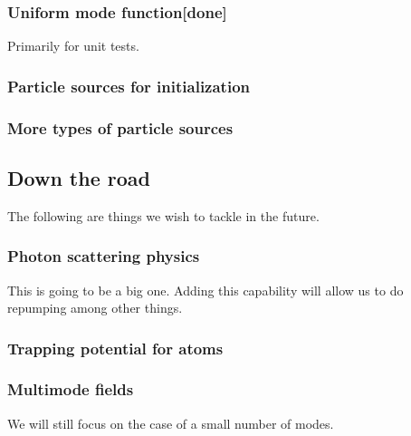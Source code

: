 \documentclass[aps, superscriptaddress, groupedaddress, preprint]{revtex4}
\begin{document}
\subsubsection{Uniform mode function{\bf [done]}}

Primarily for unit tests.


\subsubsection{Particle sources for initialization}


\subsubsection{More types of particle sources}


\subsection{Down the road}

The following are things we wish to tackle in the future.


\subsubsection{Photon scattering physics} This is going to be a big
one.  Adding this capability will allow us to do repumping among
other things.


\subsubsection{Trapping potential for atoms}


\subsubsection{Multimode fields} We will still focus on the case
of a small number of modes.
\end{document}
